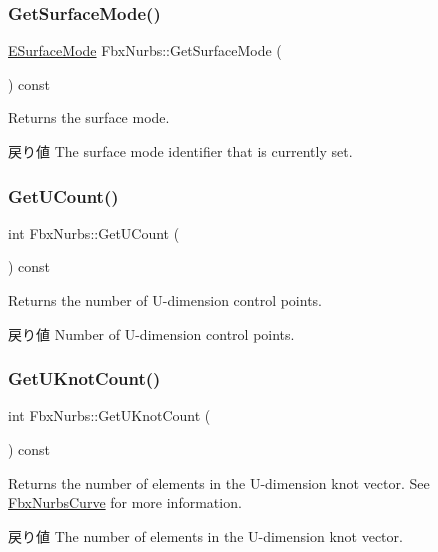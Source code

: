 \subsubsection{\texorpdfstring{Get\+Surface\+Mode()}{GetSurfaceMode()}}
{\footnotesize\ttfamily \hyperlink{class_fbx_geometry_adb9d2e34481a2cb40f1d783c665794db}{E\+Surface\+Mode} Fbx\+Nurbs\+::\+Get\+Surface\+Mode (\begin{DoxyParamCaption}{ }\end{DoxyParamCaption}) const}

Returns the surface mode. \begin{DoxyReturn}{戻り値}
The surface mode identifier that is currently set. 
\end{DoxyReturn}
\mbox{\label{class_fbx_nurbs_aa1b6891345f56dd4e30780853ec4721a}} 
\subsubsection{\texorpdfstring{Get\+U\+Count()}{GetUCount()}}
{\footnotesize\ttfamily int Fbx\+Nurbs\+::\+Get\+U\+Count (\begin{DoxyParamCaption}{ }\end{DoxyParamCaption}) const}

Returns the number of U-\/dimension control points. \begin{DoxyReturn}{戻り値}
Number of U-\/dimension control points. 
\end{DoxyReturn}
\mbox{\label{class_fbx_nurbs_aea79ac3dfc5c0d5071cb7cc1d97f5a70}} 
\subsubsection{\texorpdfstring{Get\+U\+Knot\+Count()}{GetUKnotCount()}}
{\footnotesize\ttfamily int Fbx\+Nurbs\+::\+Get\+U\+Knot\+Count (\begin{DoxyParamCaption}{ }\end{DoxyParamCaption}) const}

Returns the number of elements in the U-\/dimension knot vector. See \hyperlink{class_fbx_nurbs_curve}{Fbx\+Nurbs\+Curve} for more information. \begin{DoxyReturn}{戻り値}
The number of elements in the U-\/dimension knot vector. 
\end{DoxyReturn}
\mbox{\label{class_fbx_nurbs_a114b6f34a8d2438f3916a6ac7e96af2a}} 
